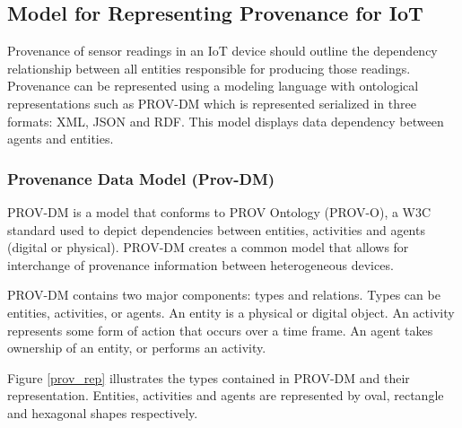 \documentclass[conference]{IEEEtran}
\begin{document}
\subsection{Model for Representing Provenance for IoT}


Provenance of sensor readings in an IoT device should outline the dependency relationship between all entities responsible for producing those readings. Provenance can be represented using a modeling language with ontological representations such as PROV-DM which is represented serialized in three formats:  XML, JSON and RDF. This model displays data dependency between agents and entities. 



\subsubsection{Provenance Data Model (Prov-DM)}

PROV-DM \cite{prov_dm} is a model that conforms to PROV Ontology (PROV-O), a W3C standard used to depict dependencies between entities, activities and agents (digital or physical). PROV-DM creates a common model that allows for interchange of provenance information between heterogeneous devices. 

\par PROV-DM contains two major components: types and relations.  Types can be entities, activities, or agents. An entity is a physical or digital object. An activity represents some form of action that occurs over a time frame.  An agent takes ownership of an entity, or performs an activity. 

Figure \ref{prov_rep} illustrates the types contained in PROV-DM and their representation. Entities, activities and agents are represented by oval, rectangle and hexagonal shapes respectively. 
\end{document}
